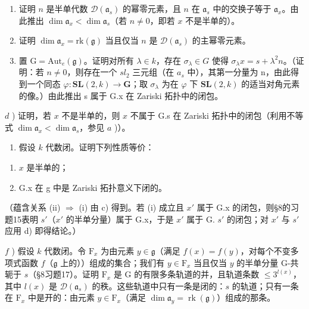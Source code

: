 \begin{enumerate}
\def\labelenumi{\alph{enumi})}
\item
  证明 \(n\) 是半单代数 \(\mathcal{D}(\mathfrak{a}_s)\) 的幂零元素，且 \(n\) 在 \(\mathfrak{a}_s\) 中的交换子等于 \(\mathfrak{a}_x\)。由此推出 \(\dim \mathfrak{a}_x < \dim \mathfrak{a}_s\)（若 \(n \neq 0\)，即若 \(x\) 不是半单的）。
\item
  证明 \(\dim \mathfrak{a}_x = \mathrm{rk}(\mathfrak{g})\) 当且仅当 \(n\) 是 \(\mathcal{D}(\mathfrak{a}_s)\) 的主幂零元素。
\item
  置 \(\mathrm{G} = \mathrm{Aut}_{e}(\mathfrak{g})\)。证明对所有 \(\lambda \in k\)，存在 \(\sigma_{\lambda} \in G\) 使得 \(\sigma_{\lambda}x = s + \lambda^{2}n\)。（证明：若 \(n \neq 0\)，则存在一个 \(sl_{2}\) 三元组（在 \(a_{s}\) 中），其第一分量为 n，由此得到一个同态 \(\varphi : \mathbf{SL}(2, k) \to \mathbf{G}\)；取 \(\sigma_{\lambda}\) 为在 \(\varphi\) 下 \(\mathbf{SL}(2, k)\) 的适当对角元素的像。）由此推出 s 属于 G.x 在 Zariski 拓扑中的闭包。
\end{enumerate}

\(d\) ) 证明，若 \(x\) 不是半单的，则 \(x\) 不属于 G.s 在 Zariski 拓扑中的闭包（利用不等式 \(\dim \mathfrak{a}_x < \dim \mathfrak{a}_s\)，参见 \(a\) )）。

\begin{enumerate}
\def\labelenumi{\alph{enumi})}
\setcounter{enumi}{4}
\tightlist
\item
  假设 \(k\) 代数闭。证明下列性质等价：
\end{enumerate}

\begin{enumerate}
\def\labelenumi{(\roman{enumi})}
\item
  \(x\) 是半单的；
\item
  G.x 在 g 中是 Zariski 拓扑意义下闭的。
\end{enumerate}

（蕴含关系 (ii) \(\Longrightarrow\) (i) 由 c) 得到。若 (i) 成立且 \(x'\) 属于 G.x 的闭包，则§8的习题15表明 \(s'\)（\(x'\) 的半单分量）属于 G.x，于是 \(x'\) 属于 G. \(s'\) 的闭包；对 \(x'\) 与 \(s'\) 应用 d) 即得结论。）

\(f\) ) 假设 \(k\) 代数闭。令 \(\mathrm{F}_x\) 为由元素 \(y\in \mathfrak{g}\)（满足 \(f(x) = f(y)\)，对每个不变多项式函数 \(f\)（\(\mathfrak{g}\) 上的））组成的集合；我们有 \(y\in \mathrm{F}_x\) 当且仅当 \(y\) 的半单分量 G-共轭于 \(s\)（§8习题17）。证明 \(\mathrm{F}_x\) 是 G 的有限多条轨道的并，且轨道条数 \(\leq 3^{l(x)}\)，其中 \(l(x)\) 是 \(\mathcal{D}(\mathfrak{a}_s)\) 的秩。这些轨道中只有一条是闭的：\(s\) 的轨道；只有一条在 \(\mathrm{F}_x\) 中是开的：由元素 \(y\in \mathrm{F}_x\)（满足 \(\dim \mathfrak{a}_y = \operatorname {rk}(\mathfrak{g})\)）组成的那条。


